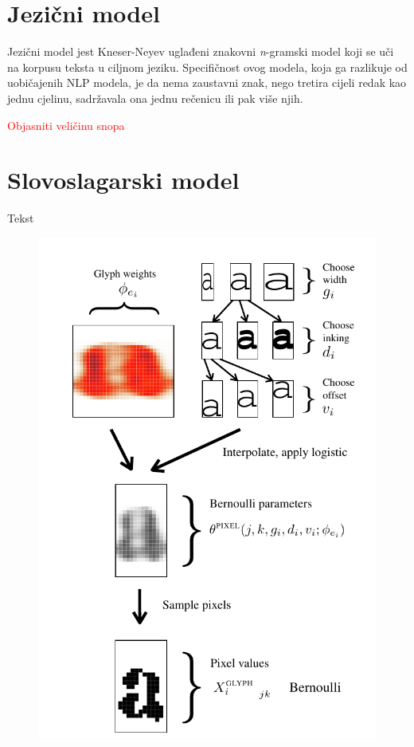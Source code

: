 \documentclass[zavrsnirad]{fer}
\begin{document}
\section{Jezični model}

Jezični model jest Kneser-Neyev uglađeni znakovni \textit{n}-gramski model \cite{Kneser1995} koji se uči na korpusu teksta u ciljnom jeziku. Specifičnost ovog modela, koja ga razlikuje od uobičajenih NLP modela, je da nema zaustavni znak, nego tretira cijeli redak kao jednu cjelinu, sadržavala ona jednu rečenicu ili pak više njih.

\textcolor{red}{Objasniti veličinu snopa} \cite{Berg2014}


\section{Slovoslagarski model}

\begin{multicols}{2}
	
	Tekst
	
	
	\columnbreak
	\begin{figure}[H]
		\centering
		\includegraphics[width=0.9\linewidth]{Figures/typesetting-model.png} 
		\caption{\cite{Berg2013}}
		\label{fig:typesetting-model}
	\end{figure}
	
\end{multicols}
\end{document}
